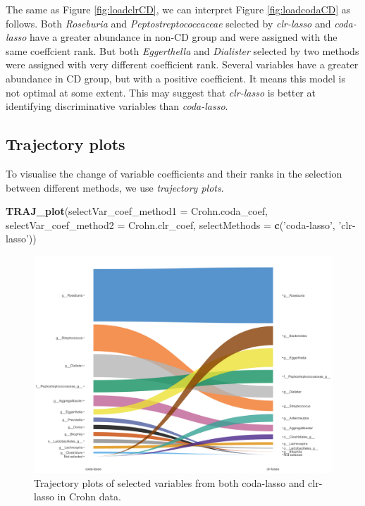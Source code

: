 \documentclass[openany]{book}
\newenvironment{Shaded}{\begin{snugshade}}{\end{snugshade}}
\newcommand{\KeywordTok}[1]{\textcolor[rgb]{0.13,0.29,0.53}{\textbf{#1}}}
\newcommand{\DataTypeTok}[1]{\textcolor[rgb]{0.13,0.29,0.53}{#1}}
\newcommand{\StringTok}[1]{\textcolor[rgb]{0.31,0.60,0.02}{#1}}
\newcommand{\NormalTok}[1]{#1}
\begin{document}
The same as Figure \ref{fig:loadclrCD}, we can interpret Figure
\ref{fig:loadcodaCD} as follows. Both \emph{Roseburia} and
\emph{Peptostreptococcaceae} selected by \emph{clr-lasso} and
\emph{coda-lasso} have a greater abundance in non-CD group and were
assigned with the same coeffcient rank. But both \emph{Eggerthella} and
\emph{Dialister} selected by two methods were assigned with very
different coefficient rank. Several variables have a greater abundance
in CD group, but with a positive coefficient. It means this model is not
optimal at some extent. This may suggest that \emph{clr-lasso} is better
at identifying discriminative variables than \emph{coda-lasso}.

\subsection{Trajectory plots}\label{trajectory-plots}

To visualise the change of variable coefficients and their ranks in the
selection between different methods, we use \emph{trajectory plots}.

\begin{Shaded}
\begin{Highlighting}[]
\KeywordTok{TRAJ_plot}\NormalTok{(}\DataTypeTok{selectVar_coef_method1 =}\NormalTok{ Crohn.coda_coef, }
          \DataTypeTok{selectVar_coef_method2 =}\NormalTok{ Crohn.clr_coef, }
          \DataTypeTok{selectMethods =} \KeywordTok{c}\NormalTok{(}\StringTok{'coda-lasso'}\NormalTok{, }\StringTok{'clr-lasso'}\NormalTok{))}
\end{Highlighting}
\end{Shaded}

\begin{figure}

{\centering \includegraphics[width=1\linewidth]{./Generated_plots/trajCD-1} 

}

\caption{Trajectory plots of selected variables from both coda-lasso and clr-lasso in Crohn data.}\label{fig:trajCD}
\end{figure}
\end{document}
